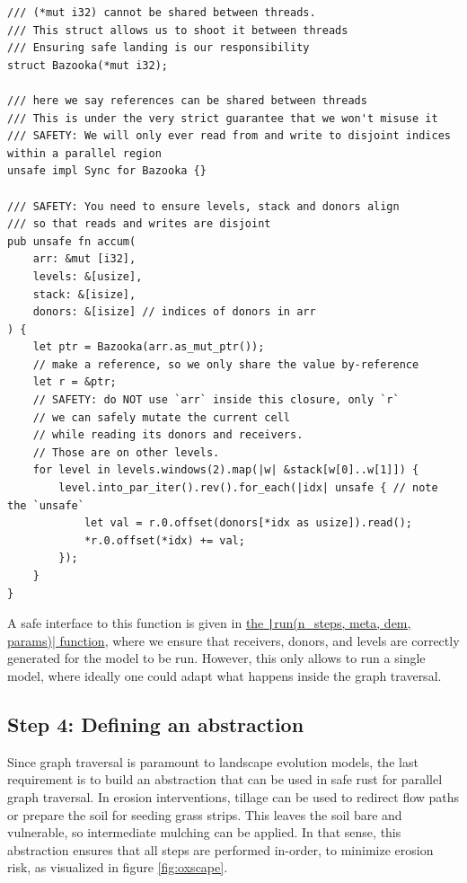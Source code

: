 \documentclass[a4paper]{article} %
\begin{document}
\begin{verbatim}
/// (*mut i32) cannot be shared between threads.
/// This struct allows us to shoot it between threads
/// Ensuring safe landing is our responsibility 
struct Bazooka(*mut i32);

/// here we say references can be shared between threads
/// This is under the very strict guarantee that we won't misuse it
/// SAFETY: We will only ever read from and write to disjoint indices within a parallel region
unsafe impl Sync for Bazooka {}

/// SAFETY: You need to ensure levels, stack and donors align
/// so that reads and writes are disjoint
pub unsafe fn accum(
    arr: &mut [i32],
    levels: &[usize],
    stack: &[isize],
    donors: &[isize] // indices of donors in arr
) {
    let ptr = Bazooka(arr.as_mut_ptr());
    // make a reference, so we only share the value by-reference
    let r = &ptr;
    // SAFETY: do NOT use `arr` inside this closure, only `r`
    // we can safely mutate the current cell
    // while reading its donors and receivers.
    // Those are on other levels.
    for level in levels.windows(2).map(|w| &stack[w[0]..w[1]]) {
        level.into_par_iter().rev().for_each(|idx| unsafe { // note the `unsafe`
            let val = r.0.offset(donors[*idx as usize]).read();
            *r.0.offset(*idx) += val;
        });
    }
}
\end{verbatim}

A safe interface to this function is given in \href{https://codeberg.org/feefladder/oxscape/src/commit/f4fc4f79f33f0d8884785b548849e701a37eb836/rust/src/lib.rs\#L438}{the \texttt|run(n_steps, meta, dem, params)| function}, where we ensure that receivers, donors, and levels are correctly generated for the model to be run. However, this only allows to run a single model, where ideally one could adapt what happens inside the graph traversal.

\subsection{Step 4: Defining an abstraction}

Since graph traversal is paramount to landscape evolution models, the last requirement is to build an abstraction that can be used in safe rust for parallel graph traversal. In erosion interventions, tillage can be used to redirect flow paths or prepare the soil for seeding grass strips. This leaves the soil bare and vulnerable, so intermediate mulching can be applied. In that sense, this abstraction ensures that all steps are performed in-order, to minimize erosion risk, as visualized in figure \ref{fig:oxscape}.
\end{document}
